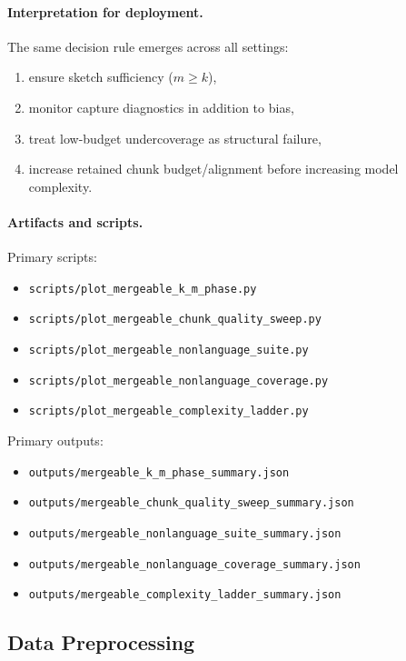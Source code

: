 \paragraph{Interpretation for deployment.}
The same decision rule emerges across all settings:
\begin{enumerate}[nosep]
    \item ensure sketch sufficiency (\(m\ge k\)),
    \item monitor capture diagnostics in addition to bias,
    \item treat low-budget undercoverage as structural failure,
    \item increase retained chunk budget/alignment before increasing model complexity.
\end{enumerate}

\paragraph{Artifacts and scripts.}
Primary scripts:
\begin{itemize}[nosep]
    \item \texttt{scripts/plot\_mergeable\_k\_m\_phase.py}
    \item \texttt{scripts/plot\_mergeable\_chunk\_quality\_sweep.py}
    \item \texttt{scripts/plot\_mergeable\_nonlanguage\_suite.py}
    \item \texttt{scripts/plot\_mergeable\_nonlanguage\_coverage.py}
    \item \texttt{scripts/plot\_mergeable\_complexity\_ladder.py}
\end{itemize}

Primary outputs:
\begin{itemize}[nosep]
    \item \texttt{outputs/mergeable\_k\_m\_phase\_summary.json}
    \item \texttt{outputs/mergeable\_chunk\_quality\_sweep\_summary.json}
    \item \texttt{outputs/mergeable\_nonlanguage\_suite\_summary.json}
    \item \texttt{outputs/mergeable\_nonlanguage\_coverage\_summary.json}
    \item \texttt{outputs/mergeable\_complexity\_ladder\_summary.json}
\end{itemize}

\subsection{Data Preprocessing}

